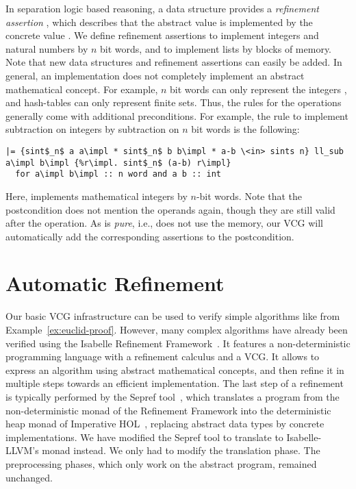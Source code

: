\documentclass[a4paper,USenglish,cleveref, autoref]{lipics-v2019}
\begin{document}
In separation logic based reasoning, a data structure provides a \emph{refinement assertion} , which describes 
that the abstract value  is implemented by the concrete value . 
We define refinement assertions to implement integers and natural numbers by $n$ bit words, and to implement lists by blocks of memory. 
Note that new data structures and refinement assertions can easily be added. In general, an implementation does not completely implement an abstract mathematical concept.
For example, $n$ bit words can only represent the integers , and hash-tables can only represent finite sets. Thus, the rules for the operations generally come with additional preconditions. 
For example, the rule to implement subtraction on integers by subtraction on $n$ bit words is the following:
\begin{lstlisting}
|= {sint$_n$ a a\impl * sint$_n$ b b\impl * a-b \<in> sints n} ll_sub a\impl b\impl {%r\impl. sint$_n$ (a-b) r\impl}
  for a\impl b\impl :: n word and a b :: int
\end{lstlisting}
Here,  implements mathematical integers by $n$-bit words.
Note that the postcondition does not mention the operands  again, though they are still valid after the operation. 
As  is \emph{pure}, i.e., does not use the memory, our VCG will automatically add the corresponding assertions to the postcondition. 


\section{Automatic Refinement}\label{sec:auto_ref}
Our basic VCG infrastructure can be used to verify simple algorithms like  from Example~\ref{ex:euclid-proof}.
However, many complex algorithms have already been verified using the Isabelle Refinement Framework~\cite{LaTu12}.
It features a non-deterministic programming language with a refinement calculus and a VCG. 
It allows to express an algorithm using abstract mathematical concepts, and then refine it in multiple steps towards an efficient implementation.
The last step of a refinement is typically performed by the Sepref tool~\cite{La15}, which translates a program from the non-deterministic monad of the Refinement Framework 
into the deterministic heap monad of Imperative HOL~\cite{BKHEM08}, replacing abstract data types by concrete implementations. 
%
We have modified the Sepref tool to translate to Isabelle-LLVM's monad instead.
We only had to modify the translation phase. The preprocessing phases, which only work on the abstract program, remained unchanged.
\end{document}
